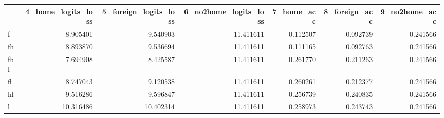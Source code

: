 \begin{tabular}{lrrrrrr}
\toprule
 & 4_home_logits_loss & 5_foreign_logits_loss & 6_no2home_logits_loss & 7_home_acc & 8_foreign_acc & 9_no2home_acc \\
\midrule
f & 8.905401 & 9.540903 & 11.411611 & 0.112507 & 0.092739 & 0.241566 \\
fh & 8.893870 & 9.536694 & 11.411611 & 0.111165 & 0.092763 & 0.241566 \\
fhl & 7.694908 & 8.425587 & 11.411611 & 0.261770 & 0.211263 & 0.241566 \\
fl & 8.747043 & 9.120538 & 11.411611 & 0.260261 & 0.212377 & 0.241566 \\
hl & 9.516286 & 9.596847 & 11.411611 & 0.256739 & 0.240835 & 0.241566 \\
l & 10.316486 & 10.402314 & 11.411611 & 0.258973 & 0.243743 & 0.241566 \\
\bottomrule
\end{tabular}
